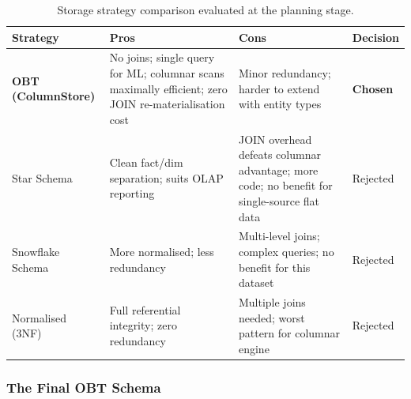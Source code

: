 \documentclass[12pt,a4paper]{article}
\begin{document}
\begin{table}[H]
\centering
\caption{Storage strategy comparison evaluated at the planning stage.}
\label{tab:storage}
\footnotesize
\renewcommand{\arraystretch}{1.4}
\begin{tabularx}{\textwidth}{|L{2.6cm}|Y|Y|C{1.6cm}|}
\hline
\textbf{Strategy} & \textbf{Pros} & \textbf{Cons} & \textbf{Decision} \\
\hline
\textbf{OBT (ColumnStore)}
  & No joins; single query for ML; columnar scans maximally efficient; zero JOIN re-materialisation cost
  & Minor redundancy; harder to extend with entity types
  & \textbf{Chosen} \\
\hline
Star Schema
  & Clean fact/dim separation; suits OLAP reporting
  & JOIN overhead defeats columnar advantage; more code; no benefit for single-source flat data
  & Rejected \\
\hline
Snowflake Schema
  & More normalised; less redundancy
  & Multi-level joins; complex queries; no benefit for this dataset
  & Rejected \\
\hline
Normalised (3NF)
  & Full referential integrity; zero redundancy
  & Multiple joins needed; worst pattern for columnar engine \cite{zaitsev2021}
  & Rejected \\
\hline
\end{tabularx}
\end{table}

\subsubsection*{The Final OBT Schema}
\end{document}
